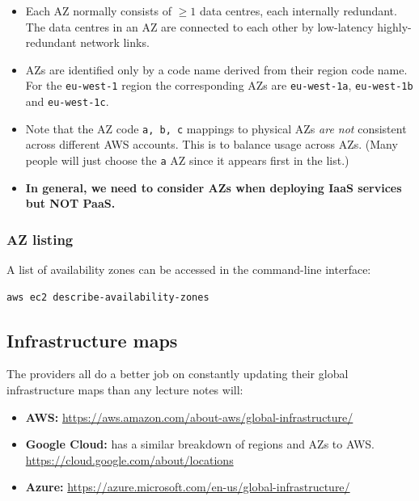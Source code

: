 \begin{itemize}
\item
  Each AZ normally consists of \(\ge 1\) data centres, each internally
  redundant. The data centres in an AZ are connected to each other by
  low-latency highly-redundant network links.
\item
  AZs are identified only by a code name derived from their region code
  name. For the \texttt{eu-west-1} region the corresponding AZs are
  \texttt{eu-west-1a}, \texttt{eu-west-1b} and \texttt{eu-west-1c}.
\item
  Note that the AZ code \texttt{a,\ b,\ c} mappings to physical AZs
  \emph{are not} consistent across different AWS accounts. This is to
  balance usage across AZs. (Many people will just choose the \texttt{a}
  AZ since it appears first in the list.)
\item
  \textbf{In general, we need to consider AZs when deploying IaaS
  services but NOT PaaS.}
\end{itemize}

\subsubsection{AZ listing}

A list of availability zones can be accessed in the command-line interface:
\begin{verbatim}
aws ec2 describe-availability-zones
\end{verbatim}



\subsection{Infrastructure maps}
\label{sec:infrastructure-maps}

The providers all do a better job on constantly updating their global
infrastructure maps than any lecture notes will:

\begin{itemize}
\item
  \textbf{AWS:}
  \url{https://aws.amazon.com/about-aws/global-infrastructure/}
\item
  \textbf{Google Cloud:} has a similar breakdown of regions and AZs to
  AWS. \url{https://cloud.google.com/about/locations}
\item
  \textbf{Azure:}
  \url{https://azure.microsoft.com/en-us/global-infrastructure/}
\end{itemize}



